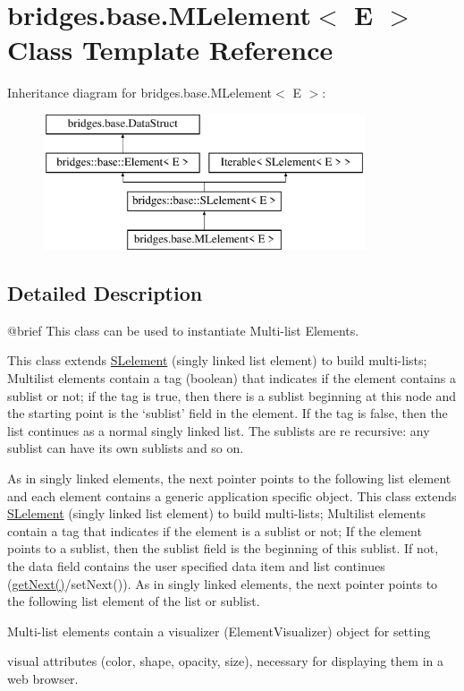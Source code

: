 \hypertarget{classbridges_1_1base_1_1_m_lelement}{}\section{bridges.\+base.\+M\+Lelement$<$ E $>$ Class Template Reference}
\label{classbridges_1_1base_1_1_m_lelement}
Inheritance diagram for bridges.\+base.\+M\+Lelement$<$ E $>$\+:\begin{figure}[H]
\begin{center}
\leavevmode
\includegraphics[height=4.000000cm]{classbridges_1_1base_1_1_m_lelement}
\end{center}
\end{figure}


\subsection{Detailed Description}
\begin{DoxyVerb}@brief This class can be used to instantiate Multi-list Elements.
\end{DoxyVerb}


This class extends \mbox{\hyperlink{classbridges_1_1base_1_1_s_lelement}{S\+Lelement}} (singly linked list element) to build multi-\/lists; Multilist elements contain a tag (boolean) that indicates if the element contains a sublist or not; if the tag is true, then there is a sublist beginning at this node and the starting point is the `sublist' field in the element. If the tag is false, then the list continues as a normal singly linked list. The sublists are re recursive\+: any sublist can have its own sublists and so on.

As in singly linked elements, the next pointer points to the following list element and each element contains a generic application specific object. This class extends \mbox{\hyperlink{classbridges_1_1base_1_1_s_lelement}{S\+Lelement}} (singly linked list element) to build multi-\/lists; Multilist elements contain a tag that indicates if the element is a sublist or not; If the element points to a sublist, then the sublist field is the beginning of this sublist. If not, the data field contains the user specified data item and list continues (\mbox{\hyperlink{classbridges_1_1base_1_1_m_lelement_a52ddc26a69eccda5f5b57b94cf87a545}{get\+Next()}}/set\+Next()). As in singly linked elements, the next pointer points to the following list element of the list or sublist. \begin{DoxyVerb}Multi-list elements contain a visualizer (ElementVisualizer) object for setting
\end{DoxyVerb}
 visual attributes (color, shape, opacity, size), necessary for displaying them in a web browser.

